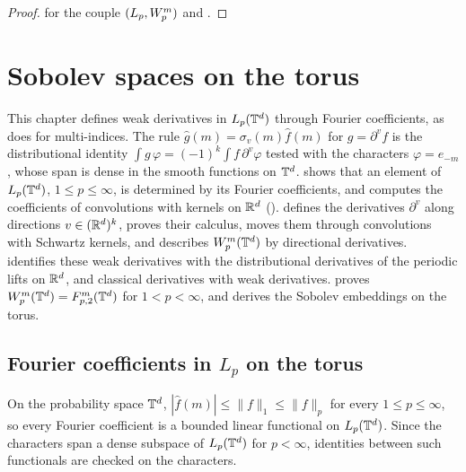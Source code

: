 \begin{proof}
\leanok
{} for the couple $(L_p, W^{m}_{p})$ and
.
\end{proof}

\chapter{Sobolev spaces on the torus}
\label{ch:sobolev-torus}

This chapter defines weak derivatives in $L_p(\mathbb{T}^d)$ through Fourier coefficients, as
 does for multi-indices. The rule
$\hat g(m) = \sigma_v(m) \hat f(m)$ for $g = \partial^v f$ is the distributional identity
$\int g \, \varphi = (-1)^k \int f \, \partial^v \varphi$ tested with the characters
$\varphi = e_{-m}$, whose span is dense in the smooth functions on $\mathbb{T}^d$.
 shows that an element of
$L_p(\mathbb{T}^d)$, $1 \leq p \leq \infty$, is determined by its Fourier coefficients, and computes the
coefficients of convolutions with kernels on $\mathbb{R}^d$ ().
 defines the derivatives $\partial^v$ along directions
$v \in (\mathbb{R}^d)^k$, proves their calculus, moves them through convolutions with Schwartz kernels,
and describes $W^{m}_{p}(\mathbb{T}^d)$ by directional derivatives.
 identifies these weak derivatives with the distributional
derivatives of the periodic lifts on $\mathbb{R}^d$, and classical derivatives with weak derivatives.
 proves $W^{m}_{p}(\mathbb{T}^d) = F^{m}_{p,2}(\mathbb{T}^d)$ for
$1 < p < \infty$, and  derives the Sobolev embeddings on the
torus.

\section{Fourier coefficients in \texorpdfstring{$L_p$}{L\_p} on the torus}
\label{sec:torus-lp-fourier-coefficients}

On the probability space $\mathbb{T}^d$, $|\hat f(m)| \leq \|f\|_1 \leq \|f\|_p$ for every
$1 \leq p \leq \infty$, so every Fourier coefficient is a bounded linear functional on
$L_p(\mathbb{T}^d)$. Since the characters span a dense subspace of $L_p(\mathbb{T}^d)$ for $p < \infty$, identities
between such functionals are checked on the characters.

